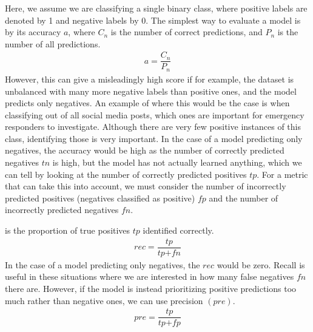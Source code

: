Here, we assume we are classifying a single binary class, where positive labels are denoted by 1 and negative labels by 0. The simplest way to evaluate a model is by its accuracy $a$, where ${C_n}$ is the number of correct predictions, and $P_n$ is the number of all predictions.
\begin{equation}
\begin{align}
a = \dfrac{C_n}{ P_n}  
\end{align}
\end{equation}
However, this can give a misleadingly high score if for example, the dataset is unbalanced with many more negative labels than positive ones, and the model predicts only negatives. An example of where this would be the case is when classifying out of all social media posts, which ones are important for emergency responders to investigate. Although there are very few positive instances of this class, identifying those is very important. In the case of a model predicting only negatives, the accuracy would be high as the number of correctly predicted negatives $\textit{tn}$ is high, but the model has not actually learned anything, which we can tell by looking at the number of correctly predicted positives $\textit{tp}$. For a metric that can take this into account, we must consider the number of incorrectly predicted positives (negatives classified as positive) $\textit{fp}$ and the number of incorrectly predicted negatives $\textit{fn}$.

 is the proportion of true positives $\textit{tp}$ identified correctly. 
\begin{equation}
\begin{align}
\textit{rec} = \dfrac{\textit{tp}}{\textit{tp} + \textit{fn}}
\end{align}
\end{equation}
In the case of a model predicting only negatives, the $\textit{rec}$ would be zero. Recall is useful in these situations where we are interested in how many false negatives ${fn}$ there are. However, if the model is instead prioritizing positive predictions too much rather than negative ones, we can use precision ${(pre)}$.
\begin{equation}
\begin{align}
\textit{pre} = \dfrac{\textit{tp}} {\textit{tp} + \textit{fp}}
\end{align}
\end{equation}

